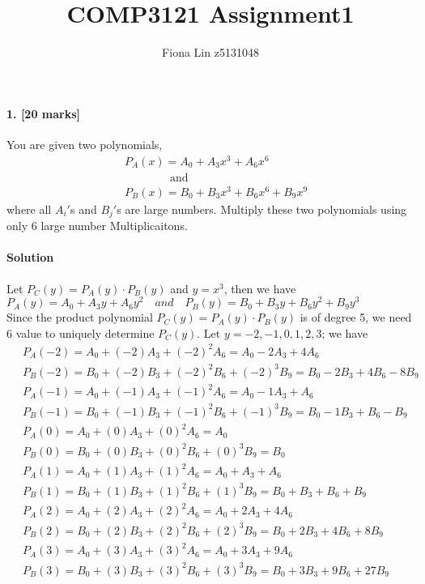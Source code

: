 \documentclass[a4paper]{scrartcl}
\title{COMP3121 Assignment1}
\author{Fiona Lin z5131048}
\begin{document}
\maketitle
\paragraph{1. [20 marks]}
\label{sec:Question 1}
You are given two polynomials,
\begin{align*} &\
  P_A(x) = A_0 + A_3x^3+A_6x^6\\ &\
\qquad\qquad\text{and}\\ &\
  P_B(x) = B_0 + B_3x^3+B_6x^6+B_9x^9
\end{align*} 
where all $A_i'$s and $B_j'$s are large numbers. Multiply these two polynomials using only 6 large number Multiplicaitons.
\paragraph{Solution}
Let $P_C(y)=P_A(y) \cdot P_B(y)$ and $y =x^3$, then we have\\ 
$P_A(y) = A_0 + A_3 y + A_6 y^2 \quad and\quad 
P_B(y) = B_0 + B_3 y + B_6 y^2 + B_9 y^3$\\
Since the product polynomial $P_C(y) = P_A(y)\cdot P_B(y)$ is of degree 5, we need 6 value to uniquely determine $P_C(y)$. Let $y = -2,-1,0,1,2,3$; we have
\begin{align*}
&\ 
P_A(-2) = A_0 + (-2) A_3 + (-2)^2  A_6  = A_0 - 2A_3 + 4A_6 \\ &\
P_B(-2) = B_0 + (-2) B_3 + (-2)^2  B_6 + (-2)^3  B_9 = B_0 -2B_3 + 4B_6 - 8B_9\\ &\
P_A(-1) = A_0 + (-1) A_3 + (-1)^2  A_6  = A_0 - 1A_3 +  A_6 \\ &\
P_B(-1) = B_0 + (-1) B_3 + (-1)^2  B_6 + (-1)^3  B_9 = B_0 -1B_3 +  B_6 -  B_9\\ &\
P_A(0) = A_0 + (0) A_3 + (0)^2 A_6 = A_0 \\ &\
P_B(0) = B_0 + (0) B_3 + (0)^2 B_6 + (0)^3 B_9= B_0\\ &\
P_A(1) = A_0 + (1) A_3 + (1)^2 A_6 = A_0 +  A_3 +   A_6 \\ &\
P_B(1) = B_0 + (1) B_3 + (1)^2 B_6 + (1)^3 B_9= B_0 +  B_3 +  B_6 +   B_9\\ &\
P_A(2) = A_0 + (2) A_3 + (2)^2 A_6 = A_0 + 2A_3 +  4A_6 \\ &\
P_B(2) = B_0 + (2) B_3 + (2)^2 B_6 + (2)^3 B_9= B_0 + 2B_3 + 4B_6 + 8 B_9\\ &\
P_A(3) = A_0 + (3) A_3 + (3)^2 A_6 = A_0 + 3A_3 +  9A_6 \\ &\
P_B(3) = B_0 + (3) B_3 + (3)^2 B_6 + (3)^3 B_9= B_0 + 3B_3 + 9B_6 + 27B_9\\ &\
\end{align*}
\end{document}
